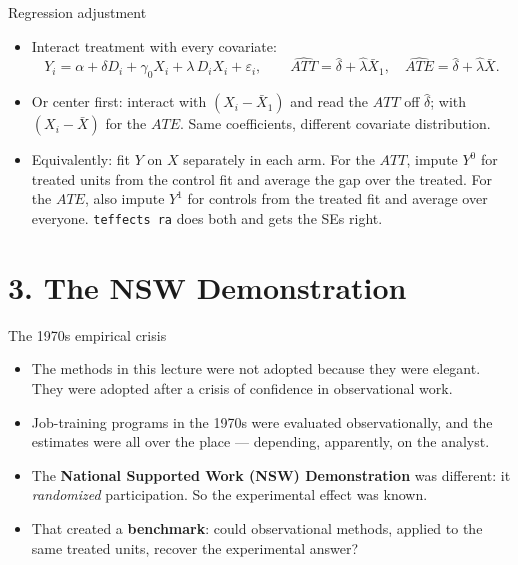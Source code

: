 \documentclass[
  11pt,
  ignorenonframetext,
  aspectratio=169,
]{beamer}
\providecommand{\tightlist}{%
  \setlength{\itemsep}{0pt}\setlength{\parskip}{0pt}}
\begin{document}
\begin{frame}[fragile]{Regression adjustment}
\protect{}\label{regression-adjustment}
\begin{itemize}
\item
  Interact treatment with every covariate: \[
  Y_i = \alpha + \delta D_i + \gamma_0 X_i + \lambda\, D_i X_i + \varepsilon_i,
  \qquad
  \widehat{ATT} = \hat\delta + \hat\lambda \bar X_1, \quad
  \widehat{ATE} = \hat\delta + \hat\lambda \bar X .
  \]
\item
  Or center first: interact with \((X_i - \bar X_1)\) and read the
  \(ATT\) off \(\hat\delta\); with \((X_i - \bar X)\) for the \(ATE\).
  Same coefficients, different covariate distribution.
\item
  Equivalently: fit \(Y\) on \(X\) separately in each arm. For the
  \(ATT\), impute \(Y^0\) for treated units from the control fit and
  average the gap over the treated. For the \(ATE\), also impute \(Y^1\)
  for controls from the treated fit and average over everyone.
  \texttt{teffects\ ra} does both and gets the SEs right.
\end{itemize}
\end{frame}

\section{3. The NSW Demonstration}\label{the-nsw-demonstration}

\begin{frame}{The 1970s empirical crisis}
\protect{}\label{the-1970s-empirical-crisis}
\begin{itemize}
\tightlist
\item
  The methods in this lecture were not adopted because they were
  elegant. They were adopted after a crisis of confidence in
  observational work.
\item
  Job-training programs in the 1970s were evaluated observationally, and
  the estimates were all over the place --- depending, apparently, on
  the analyst.
\item
  The \textbf{National Supported Work (NSW) Demonstration} was
  different: it \emph{randomized} participation. So the experimental
  effect was known.
\item
  That created a \textbf{benchmark}: could observational methods,
  applied to the same treated units, recover the experimental answer?
\end{itemize}
\end{frame}
\end{document}
